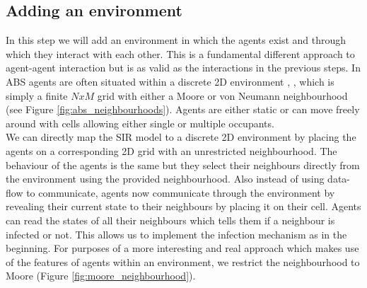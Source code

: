 \subsection{Adding an environment}
\label{sec:step5_environment}
In this step we will add an environment in which the agents exist and through which they interact with each other. This is a fundamental different approach to agent-agent interaction but is as valid as the interactions in the previous steps.
In ABS agents are often situated within a discrete 2D environment \cite{schelling_dynamic_1971}, \cite{epstein_growing_1996}, \cite{epstein_agent_zero:_2014} which is simply a finite $N x M$ grid with either a Moore or von Neumann neighbourhood (see Figure \ref{fig:abs_neighbourhoods}). Agents are either static or can move freely around with cells allowing either single or multiple occupants. \\
We can directly map the SIR model to a discrete 2D environment by placing the agents on a corresponding 2D grid with an unrestricted neighbourhood. The behaviour of the agents is the same but they select their neighbours directly from the environment using the provided neighbourhood. Also instead of using data-flow to communicate, agents now communicate through the environment by revealing their current state to their neighbours by placing it on their cell. Agents can read the states of all their neighbours which tells them if a neighbour is infected or not. This allows us to implement the infection mechanism as in the beginning. For purposes of a more interesting and real approach which makes use of the features of agents within an environment, we restrict the neighbourhood to Moore (Figure \ref{fig:moore_neighbourhood}).

